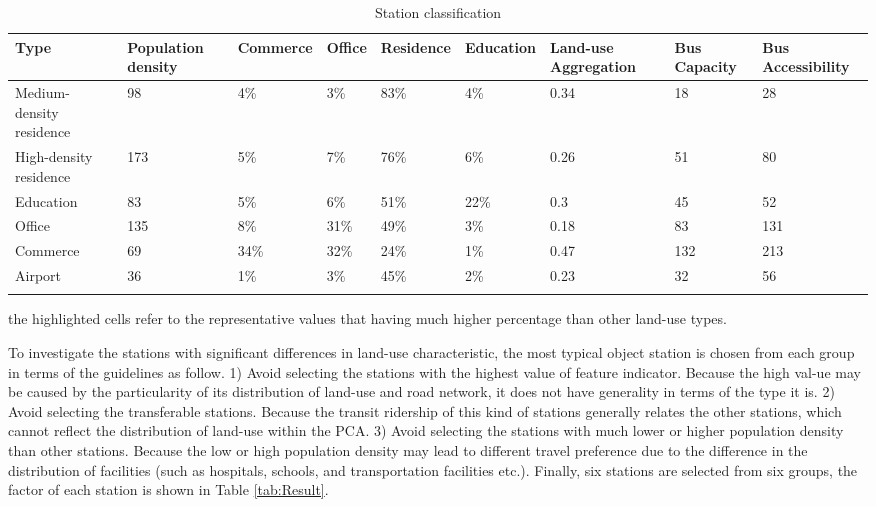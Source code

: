 \documentclass[utf8]{article}
\begin{document}
\begin{table}
	\centering
	\caption{Station classification}
	\label{tab:StationClassification}
	\begin{tabular}{p{12em}<{\centering}p{4em}<{\centering}p{4em}<{\centering}p{4em}<{\centering}p{4em}<{\centering}p{4em}<{\centering}p{5em}<{\centering}p{5em}<{\centering}p{5em}<{\centering}}
		
		\Xhline{1.5pt}
		Type & Population density & Commerce & Office & Residence & Education & Land-use Aggregation & Bus Capacity & Bus Accessibility \\
		\midrule
		
		Medium-density residence & 98 & 4\% & 3\% & \cellcolor[rgb]{.8, .8, .8} 83\% & 4\% & 0.34 & 18 & 28 \\
		High-density residence & 173 & 5\% & 7\% & \cellcolor[rgb]{.8, .8, .8} 76\% & 6\% & 0.26 & 51 & 80 \\
		Education & 83 & 5\% & 6\% & 51\% & \cellcolor[rgb]{.8, .8, .8} 22\% & 0.3 & 45 & 52 \\
		Office & 135 & 8\% & \cellcolor[rgb]{.8, .8, .8} 31\% & 49\% & 3\% & 0.18 & 83 & 131 \\
		Commerce & 69 & \cellcolor[rgb]{.8, .8, .8} 34\% & \cellcolor[rgb]{.8, .8, .8} 32\% & 24\% & 1\% & 0.47 & 132 & 213 \\
		Airport & 36 & 1\% & 3\% & 45\% & 2\% & 0.23 & 32 & 56 \\
		\Xhline{1.5pt}
		
	\end{tabular}
	\begin{description}
		\label{note:tab:StationClassification}
		\item[*Note:] the highlighted cells refer to the representative values that having much higher percentage than other land-use types.
	\end{description}

\end{table}

%
To investigate the stations with significant differences in land-use characteristic, the most typical object station is chosen from each group in terms of the guidelines as follow. 1) Avoid selecting the stations with the highest value of feature indicator. Because the high val-ue may be caused by the particularity of its distribution of land-use and road network, it does not have generality in terms of the type it is. 2) Avoid selecting the transferable stations. Because the transit ridership of this kind of stations generally relates the other stations, which cannot reflect the distribution of land-use within the PCA. 3) Avoid selecting the stations with much lower or higher population density than other stations. Because the low or high population density may lead to different travel preference due to the difference in the distribution of facilities (such as hospitals, schools, and transportation facilities etc.). Finally, six stations are selected from six groups, the factor of each station is shown in Table \ref{tab:Result}.
\end{document}
